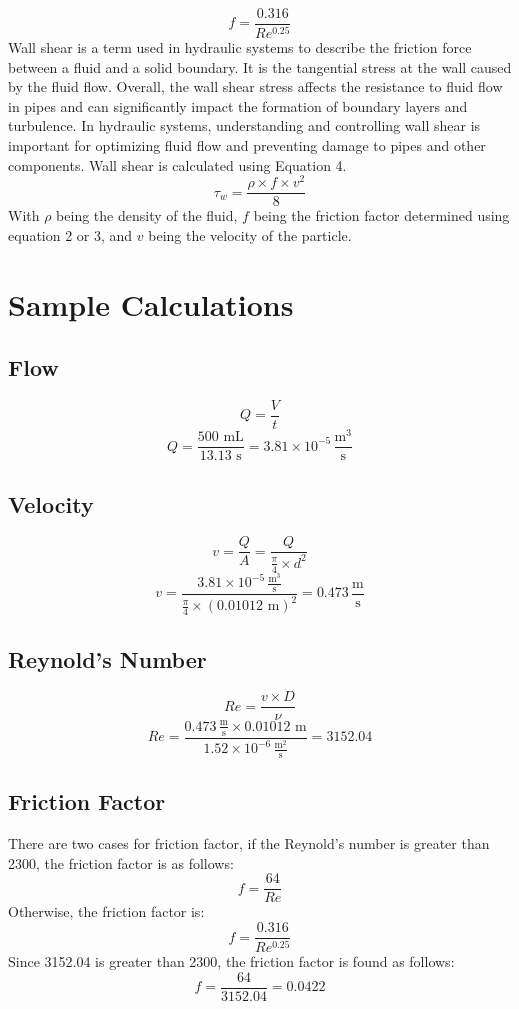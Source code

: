 \documentclass{article}
\begin{document}
\begin{equation} 
    f=\frac{0.316}{Re^{0.25}}
\end{equation}
Wall shear is a term used in hydraulic systems to describe the friction force between a fluid and a solid boundary. It is the tangential stress at the wall caused by the fluid flow. Overall, the wall shear stress affects the resistance to fluid flow in pipes and can significantly impact the formation of boundary layers and turbulence. In hydraulic systems, understanding and controlling wall shear is important for optimizing fluid flow and preventing damage to pipes and other components. Wall shear is calculated using Equation 4. 
\begin{equation} 
    \tau_w=\frac{\rho\times f\times v^2}{8}
\end{equation}
With $\rho$ being the density of the fluid, $f$ being the friction factor determined using equation 2 or 3, and $v$ being the velocity of the particle.
\newpage
\section{Sample Calculations}
\subsection{Flow}
\[Q=\frac{V}{t}\] 
\[Q=\frac{500\text{ mL}}{13.13\text{ s}}=\boxed{3.81\times 10^{-5}\, \frac{\text{m}^3}{\text{s}}}\]
\subsection{Velocity} 
\[v=\frac{Q}{A}=\frac{Q}{\frac{\pi}{4}\times d^2}\]  
\[v=\frac{3.81\times 10^{-5}\, \frac{\text{m}^3}{\text{s}}}{\frac{\pi}{4}\times (0.01012\text{ m})^2}=\boxed{0.473\, \frac{\text{m}}{\text{s}}}\]
\subsection{Reynold's Number} 
\[Re=\frac{v\times D}{\nu}\] 
\[Re=\frac{0.473\, \frac{\text{m}}{\text{s}}\times 0.01012\text{ m}}{1.52\times 10^{-6}\,\frac{\text{m}^2}{\text{s}}}=\boxed{3152.04}\] 
\subsection{Friction Factor} 
\noindent There are two cases for friction factor, if the Reynold's number is greater than 2300, the friction factor is as follows: 
\[f=\frac{64}{Re}\] 
Otherwise, the friction factor is: 
\[f=\frac{0.316}{Re^{0.25}}\] 
Since 3152.04 is greater than 2300, the friction factor is found as follows: 
\[f=\frac{64}{3152.04}=\boxed{0.0422}\] 
\end{document}
